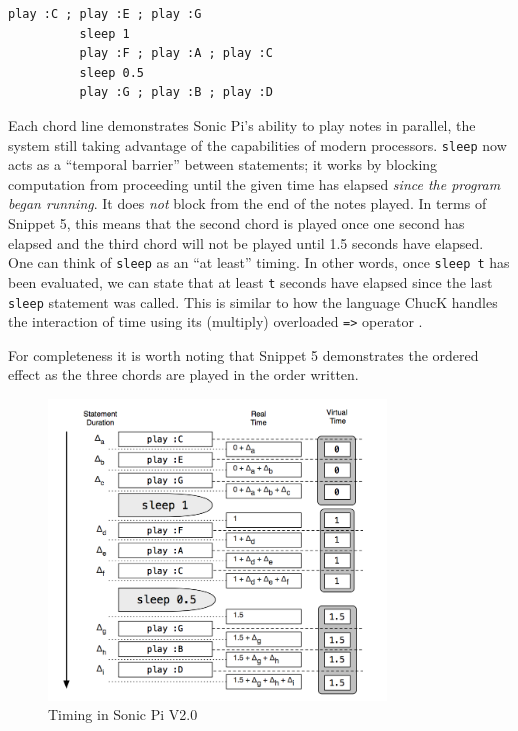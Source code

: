 \documentclass[11pt, abstracton, twoside, titlepage=true]{scrartcl}
\begin{document}
\begin{minipage}{\textwidth}
	\begin{lstlisting}[style = sonicpi]
		  play :C ; play :E ; play :G
		  sleep 1
		  play :F ; play :A ; play :C
		  sleep 0.5
		  play :G ; play :B ; play :D
	\end{lstlisting}
\end{minipage}

Each chord line demonstrates Sonic Pi's ability to play notes in parallel, the 
system still taking advantage of the capabilities of modern processors. \texttt
{sleep} now acts as a ``temporal barrier'' between statements; it works by 
blocking computation from proceeding until the given time has elapsed \emph{
since the program began running}. It does \emph{not} block from the end of the 
notes played. In terms of Snippet 5, this means that the second chord is 
played once one second has elapsed and the third chord will not be played 
until 1.5 seconds have elapsed. One can think of \texttt{sleep} as an ``at 
least'' timing. In other words, once \texttt{sleep t} has been evaluated, we 
can state that at least \texttt{t} seconds have elapsed since the last \texttt{
sleep} statement was called. This is similar to how the language ChucK handles 
the interaction of time using its (multiply) overloaded \texttt{=>} operator 
\cite{WC03}.

For completeness it is worth noting that Snippet 5 demonstrates the ordered 
effect as the three chords are played in the order written.

\begin{figure}[ht]
	\centering
	\includegraphics[width=0.8\textwidth]{images/sonic-two.png}
	\caption{Timing in Sonic Pi V2.0 \cite{AOB14}}
\end{figure}
\end{document}
